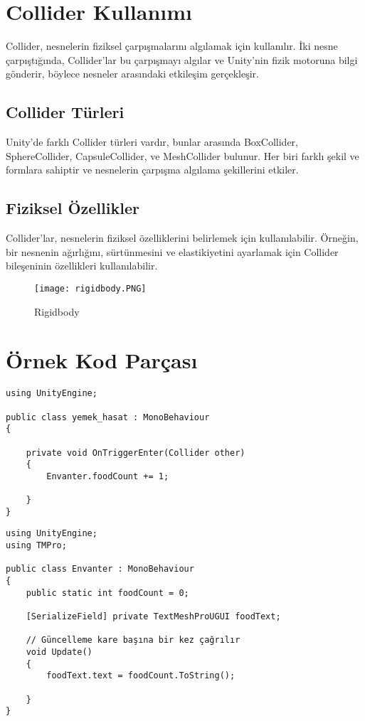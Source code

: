 \documentclass{article}
\begin{document}
\section{Collider Kullanımı}

Collider, nesnelerin fiziksel çarpışmalarını algılamak için kullanılır. İki nesne çarpıştığında, Collider'lar bu çarpışmayı algılar ve Unity'nin fizik motoruna bilgi gönderir, böylece nesneler arasındaki etkileşim gerçekleşir.

\subsection{Collider Türleri}

Unity'de farklı Collider türleri vardır, bunlar arasında BoxCollider, SphereCollider, CapsuleCollider, ve MeshCollider bulunur. Her biri farklı şekil ve formlara sahiptir ve nesnelerin çarpışma algılama şekillerini etkiler.
\subsection{Fiziksel Özellikler}

Collider'lar, nesnelerin fiziksel özelliklerini belirlemek için kullanılabilir. Örneğin, bir nesnenin ağırlığını, sürtünmesini ve elastikiyetini ayarlamak için Collider bileşeninin özellikleri kullanılabilir.

\begin{figure}[h]
    \centering
    \texttt{[image: rigidbody.PNG]}
    \caption{Rigidbody}
    \label{fig:resim12}
\end{figure}
\clearpage
\section{Örnek Kod Parçası}

\begin{verbatim}
using UnityEngine;

public class yemek_hasat : MonoBehaviour
{
    
    private void OnTriggerEnter(Collider other)
    {
        Envanter.foodCount += 1;
        
    }
}
\end{verbatim}

\begin{verbatim}
using UnityEngine;
using TMPro;

public class Envanter : MonoBehaviour
{ 
    public static int foodCount = 0;
    
    [SerializeField] private TextMeshProUGUI foodText;

    // Güncelleme kare başına bir kez çağrılır
    void Update()
    {
        foodText.text = foodCount.ToString();

    }
}
\end{verbatim}
\end{document}
